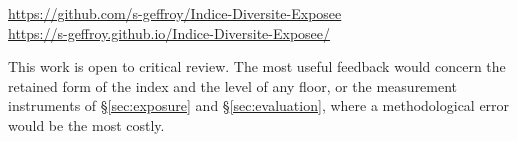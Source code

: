 \documentclass[11pt,a4paper]{article}
\begin{document}
\begin{center}
\url{https://github.com/s-geffroy/Indice-Diversite-Exposee}\\
\url{https://s-geffroy.github.io/Indice-Diversite-Exposee/}
\end{center}

This work is open to critical review. The most useful feedback would concern the retained form
of the index and the level of any floor, or the measurement instruments of \S\ref{sec:exposure}
and \S\ref{sec:evaluation}, where a methodological error would be the most costly.


\end{document}
